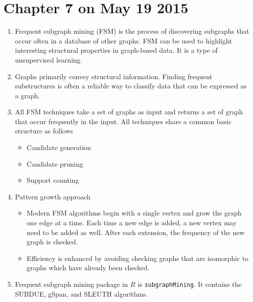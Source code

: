 \documentclass[14pt]{article}
\begin{document}
\section{Chapter 7 on May 19 2015}
\begin{enumerate}
 \item Frequent subgraph mining (FSM) is the process of discovering subgraphs that occur often in a database of other graphs. FSM can be used to highlight interesting structural properties in graph-based data. It is a type of unsupervised learning.
 
 \item Graphs primarily convey structural information. Finding frequent substructures is often a reliable way to classify data that can be expressed as a graph. 

\item All FSM techniques take a set of graphs as input and returns a set of graph that occur frequently in the input. All techniques share a common basic structure as follows
 \begin{itemize}
  \item Candidate generation
  \item Candidate pruning
  \item Support counting
 \end{itemize}
 
\item Pattern growth approach 
 \begin{itemize}
  \item Modern FSM algorithms begin with a single vertex and grow the graph one edge at a time. Each time a new edge is added, a new vertex may need to be added as well. After each extension, the frequency of the new graph is checked.
  \item Efficiency is enhanced by avoiding checking graphs that are isomorphic to graphs which have already been checked.
\end{itemize}  

\item Frequent subgraph mining package in $R$ is \texttt{subgraphMining}. It contains the SUBDUE, gSpan, and SLEUTH algorithms.


\end{enumerate}
\end{document}
